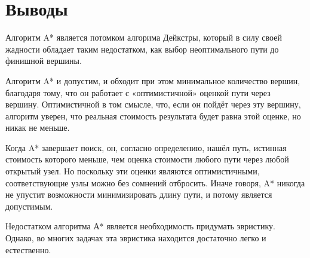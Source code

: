 \section{Выводы}

Алгоритм A* является потомком алгорима Дейкстры, который в силу своей жадности обладает таким недостатком, как выбор неоптимального пути до финишной вершины.\newline

Алгоритм A* и допустим, и обходит при этом минимальное количество вершин, благодаря тому, что он работает с «оптимистичной» оценкой пути через вершину. Оптимистичной в том смысле, что, если он пойдёт через эту вершину, алгоритм уверен, что реальная стоимость результата будет равна этой оценке, но никак не меньше.\newline

Когда A* завершает поиск, он, согласно определению, нашёл путь, истинная стоимость которого меньше, чем оценка стоимости любого пути через любой открытый узел. Но поскольку эти оценки являются оптимистичными, соответствующие узлы можно без сомнений отбросить. Иначе говоря, A* никогда не упустит возможности минимизировать длину пути, и потому является допустимым.\newline

Недостатком алгоритма А* является необходимость придумать эвристику. Однако, во многих задачах эта эвристика находится достаточно легко и естественно. \newline

\pagebreak
